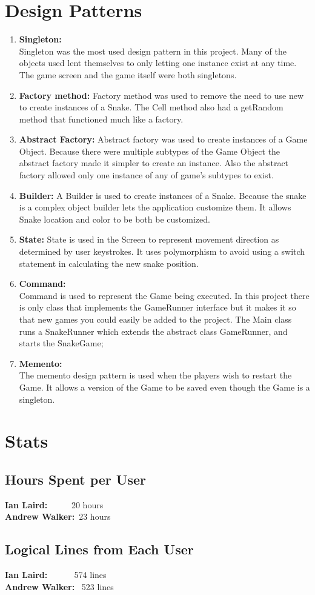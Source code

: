 \documentclass[titlepage]{article}
\begin{document}
	\section{Design Patterns}
		\begin{enumerate}
			\item \textbf{Singleton:}\\
				Singleton was the most used design pattern in this project. Many of the objects used lent themselves to only letting one instance exist at any
				time. The game screen and the game itself were both singletons.
			\item \textbf{Factory method:}
				Factory method was used to remove the need to use new to create instances of a Snake. The Cell method also had a getRandom method that functioned much like a factory.
			\item \textbf{Abstract Factory:}
				Abstract factory was used to create instances of a Game Object. Because there were multiple subtypes of the Game Object the abstract factory made it simpler to create an instance. Also the abstract factory allowed only one instance of any of game's subtypes to exist.
			\item \textbf{Builder:}
				A Builder is used to create instances of a Snake. Because the snake is a complex object builder lets the application customize them. It allows Snake location and color to be both be customized.
			\item \textbf{State:}
				State is used in the Screen to represent movement direction as determined by user keystrokes. It uses polymorphism to avoid using a switch statement in calculating the new snake position.
			\item \textbf{Command:}\\
				Command is used to represent the Game being executed. In this project there is only class that implements the GameRunner interface but it makes it so that new games you could easily be added to the project. The Main class runs a SnakeRunner which extends the abstract class GameRunner, and starts the SnakeGame;
			\item \textbf{Memento:}\\
				The memento design pattern is used when the players wish to restart the Game. It allows a version of the Game to be saved even though the Game is a singleton.
		\end{enumerate}
	\section{Stats}
	\subsection{Hours Spent per User}
	\textbf{Ian Laird:} ~~~~~20 hours\\
	\textbf{Andrew Walker:}~23 hours
	\subsection{Logical Lines from Each User}
	\textbf{Ian Laird:} ~~~~~ 574 lines\\
	\textbf{Andrew Walker:}~ 523 lines
\end{document}
